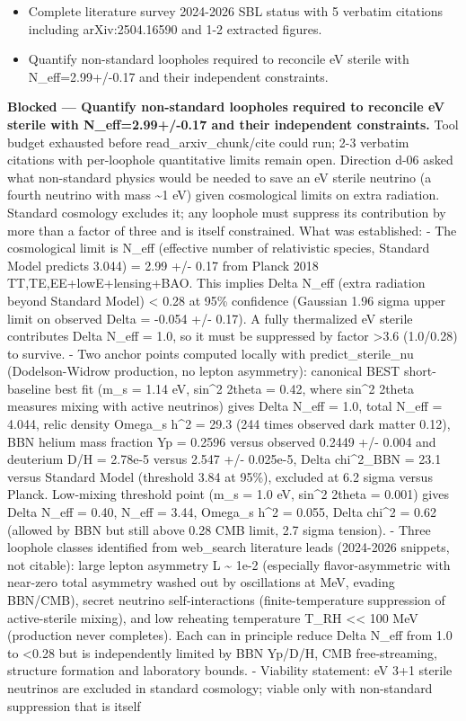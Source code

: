 \documentclass[11pt,a4paper]{article}
\begin{document}
\begin{itemize}
  \item Complete literature survey 2024-2026 SBL status with 5 verbatim citations including arXiv:2504.16590 and 1-2 extracted figures.
  \item Quantify non-standard loopholes required to reconcile eV sterile with N\_eff=2.99+/-0.17 and their independent constraints.
\end{itemize}
\textbf{Blocked --- Quantify non-standard loopholes required to reconcile eV sterile with N\_eff=2.99+/-0.17 and their independent constraints.} Tool budget exhausted before read\_arxiv\_chunk/cite could run; 2-3 verbatim citations with per-loophole quantitative limits remain open. Direction d-06 asked what non-standard physics would be needed to save an eV sterile neutrino (a fourth neutrino with mass \textasciitilde{}1 eV) given cosmological limits on extra radiation. Standard cosmology excludes it; any loophole must suppress its contribution by more than a factor of three and is itself constrained. What was established: - The cosmological limit is N\_eff (effective number of relativistic species, Standard Model predicts 3.044) = 2.99 +/- 0.17 from Planck 2018 TT,TE,EE+lowE+lensing+BAO. This implies Delta N\_eff (extra radiation beyond Standard Model) \textless{} 0.28 at 95\% confidence (Gaussian 1.96 sigma upper limit on observed Delta = -0.054 +/- 0.17). A fully thermalized eV sterile contributes Delta N\_eff = 1.0, so it must be suppressed by factor \textgreater{}3.6 (1.0/0.28) to survive. - Two anchor points computed locally with predict\_sterile\_nu (Dodelson-Widrow production, no lepton asymmetry): canonical BEST short-baseline best fit (m\_s = 1.14 eV, sin\textasciicircum{}2 2theta = 0.42, where sin\textasciicircum{}2 2theta measures mixing with active neutrinos) gives Delta N\_eff = 1.0, total N\_eff = 4.044, relic density Omega\_s h\textasciicircum{}2 = 29.3 (244 times observed dark matter 0.12), BBN helium mass fraction Yp = 0.2596 versus observed 0.2449 +/- 0.004 and deuterium D/H = 2.78e-5 versus 2.547 +/- 0.025e-5, Delta chi\textasciicircum{}2\_BBN = 23.1 versus Standard Model (threshold 3.84 at 95\%), excluded at 6.2 sigma versus Planck. Low-mixing threshold point (m\_s = 1.0 eV, sin\textasciicircum{}2 2theta = 0.001) gives Delta N\_eff = 0.40, N\_eff = 3.44, Omega\_s h\textasciicircum{}2 = 0.055, Delta chi\textasciicircum{}2 = 0.62 (allowed by BBN but still above 0.28 CMB limit, 2.7 sigma tension). - Three loophole classes identified from web\_search literature leads (2024-2026 snippets, not citable): large lepton asymmetry L \textasciitilde{} 1e-2 (especially flavor-asymmetric with near-zero total asymmetry washed out by oscillations at MeV, evading BBN/CMB), secret neutrino self-interactions (finite-temperature suppression of active-sterile mixing), and low reheating temperature T\_RH \textless{}\textless{} 100 MeV (production never completes). Each can in principle reduce Delta N\_eff from 1.0 to \textless{}0.28 but is independently limited by BBN Yp/D/H, CMB free-streaming, structure formation and laboratory bounds. - Viability statement: eV 3+1 sterile neutrinos are excluded in standard cosmology; viable only with non-standard suppression that is itself 
\end{document}
